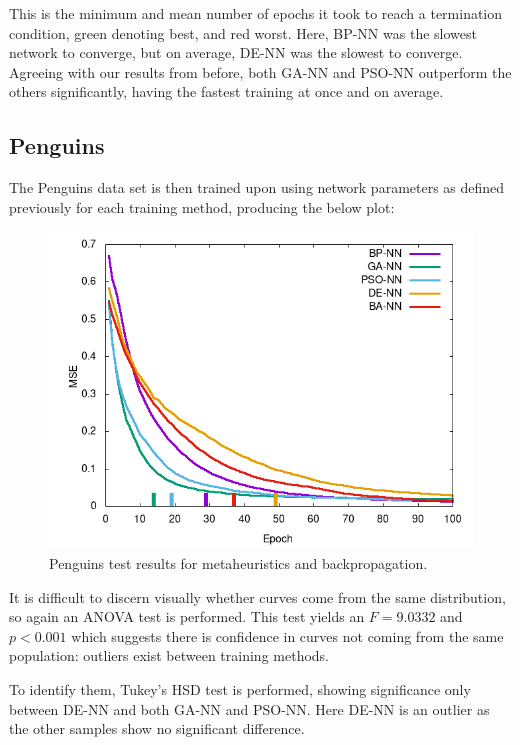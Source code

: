 \documentclass[a4paper,12pt]{article}
\begin{document}
\pagebreak

This is the minimum and mean number of epochs it took to reach a termination condition, green denoting best, and red worst. Here, BP-NN was the slowest network to converge, but on average, DE-NN was the slowest to converge. Agreeing with our results from before, both GA-NN and PSO-NN outperform the others significantly, having the fastest training at once and on average.

\subsection{Penguins}

The Penguins data set is then trained upon using network parameters as defined previously for each training method, producing the below plot:

\begin{figure}[h!]
\centering
\includegraphics[scale=0.60]{images/penguins-plot.png}
\caption{Penguins test results for metaheuristics and backpropagation.}
\label{fig:penguins}
\end{figure}

It is difficult to discern visually whether curves come from the same distribution, so again an ANOVA test is performed. This test yields an $F = 9.0332$ and $p < 0.001$ which suggests there is confidence in curves not coming from the same population: outliers exist between training methods.

To identify them, Tukey's HSD test is performed, showing significance only between DE-NN and both GA-NN and PSO-NN. Here DE-NN is an outlier as the other samples show no significant difference.
\end{document}

